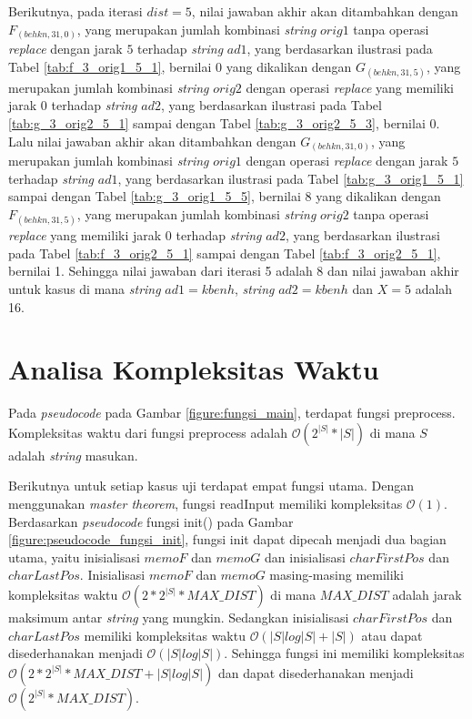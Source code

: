 Berikutnya, pada iterasi $ dist = 5 $, nilai jawaban akhir akan ditambahkan dengan $ F_{(behkn, 31,0)} $, yang merupakan jumlah kombinasi \textit{string} $ orig1 $ tanpa operasi \textit{replace} dengan jarak $ 5 $ terhadap \textit{string} $ ad1 $, yang berdasarkan ilustrasi pada Tabel \ref{tab:f_3_orig1_5_1}, bernilai 0 yang dikalikan dengan $ G_{(behkn, 31,5)} $, yang merupakan jumlah kombinasi \textit{string} $ orig2 $ dengan operasi \textit{replace} yang memiliki jarak $ 0 $ terhadap \textit{string} $ ad2 $, yang berdasarkan ilustrasi pada Tabel \ref{tab:g_3_orig2_5_1} sampai dengan Tabel \ref{tab:g_3_orig2_5_3}, bernilai 0. Lalu nilai jawaban akhir akan ditambahkan dengan $ G_{(behkn, 31,0)} $, yang merupakan jumlah kombinasi \textit{string} $ orig1 $ dengan operasi \textit{replace} dengan jarak $ 5 $ terhadap \textit{string} $ ad1 $, yang berdasarkan ilustrasi pada Tabel \ref{tab:g_3_orig1_5_1} sampai dengan Tabel \ref{tab:g_3_orig1_5_5}, bernilai 8 yang dikalikan dengan $ F_{(behkn, 31,5)} $, yang merupakan jumlah kombinasi \textit{string} $ orig2 $ tanpa operasi \textit{replace} yang memiliki jarak $ 0 $ terhadap \textit{string} $ ad2 $, yang berdasarkan ilustrasi pada Tabel \ref{tab:f_3_orig2_5_1} sampai dengan Tabel \ref{tab:f_3_orig2_5_1}, bernilai 1. Sehingga nilai jawaban dari iterasi 5 adalah 8 dan nilai jawaban akhir untuk kasus di mana \textit{string} $ ad1 = kbenh $, \textit{string} $ ad2 = kbenh $ dan $ X=5 $ adalah 16.

\section{Analisa Kompleksitas Waktu}

Pada \textit{pseudocode} pada Gambar \ref{figure:fungsi_main}, terdapat fungsi preprocess. Kompleksitas waktu dari fungsi preprocess adalah $ \mathcal{O}(2^{|S|} * |S|) $ di mana $ S $ adalah \textit{string} masukan.

Berikutnya untuk setiap kasus uji terdapat empat fungsi utama. Dengan menggunakan \textit{master theorem}, fungsi readInput memiliki kompleksitas $ \mathcal{O}(1) $. Berdasarkan \textit{pseudocode} fungsi init() pada Gambar \ref{figure:pseudocode_fungsi_init}, fungsi init dapat dipecah menjadi dua bagian utama, yaitu inisialisasi $ memoF $ dan $ memoG $ dan inisialisasi $ charFirstPos $ dan $ charLastPos $. Inisialisasi $ memoF $ dan $ memoG $ masing-masing memiliki kompleksitas waktu $ \mathcal{O}(2 * 2^{|S|} * MAX\_DIST) $ di mana $ MAX\_DIST $ adalah jarak maksimum antar \textit{string} yang mungkin. Sedangkan inisialisasi $ charFirstPos $ dan $ charLastPos $ memiliki kompleksitas waktu $ \mathcal{O}(|S| log |S| + |S|) $ atau dapat disederhanakan menjadi $ \mathcal{O}(|S| log |S|) $. Sehingga fungsi ini memiliki kompleksitas $ \mathcal{O}(2 * 2^{|S|} * MAX\_DIST + |S| log |S|) $ dan dapat disederhanakan menjadi $ \mathcal{O}(2^{|S|} * MAX\_DIST) $.

